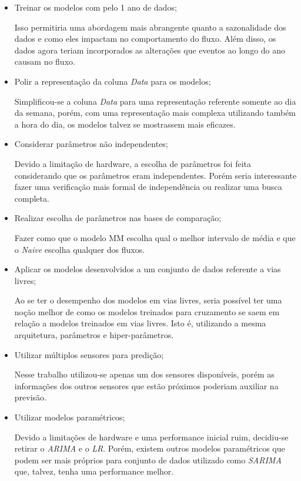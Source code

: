 \begin{itemize}
    \item Treinar os modelos com pelo 1 ano de dados;
    
    Isso permitiria uma abordagem mais abrangente quanto a sazonalidade dos dados e como eles impactam no comportamento do fluxo. Além disso, os dados agora teriam incorporados as alterações que eventos ao longo do ano causam no fluxo.
    
    \item Polir a representação da coluna  \textit{Data} para os modelos;
    
    Simplificou-se a coluna \textit{Data} para uma representação referente somente ao dia da semana, porém, com uma representação mais complexa utilizando também a hora do dia, os modelos talvez se mostrassem mais eficazes.
    
    \item Considerar parâmetros não independentes;
    
    Devido a limitação de hardware, a escolha de parâmetros foi feita considerando que os parâmetros eram independentes. Porém seria interessante fazer uma verificação mais formal de independência ou realizar uma busca completa.
    
    \item Realizar escolha de parâmetros nas bases de comparação;
    
    Fazer como que o modelo \acrshort{MM} escolha qual o melhor intervalo de média e que o \textit{Naive} escolha qualquer dos fluxos.

    \item Aplicar os modelos desenvolvidos a um conjunto de dados referente a vias livres;
    
    Ao se ter o desempenho dos modelos em vias livres, seria possível ter uma noção melhor de como os modelos treinados para cruzamento se saem em relação a modelos treinados em vias livres. Isto é, utilizando a mesma arquitetura, parâmetros e hiper-parâmetros.
    
    \item Utilizar múltiplos sensores para predição;
    
    Nesse trabalho utilizou-se apenas um dos sensores disponíveis, porém as informações dos outros sensores que estão próximos poderiam auxiliar na previsão.
    
    \item Utilizar modelos paramétricos;
    
    Devido a limitações de hardware e uma performance inicial ruim, decidiu-se retirar o \textit{\acrfull{ARIMA}} e o \textit{\acrfull{LR}}. Porém, existem outros modelos paramétricos que podem ser mais próprios para conjunto de dados utilizado como \textit{\acrfull{SARIMA}} que, talvez, tenha uma performance melhor.
    

\end{itemize}
